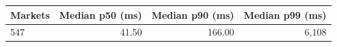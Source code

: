 \begin{tabular}{lrrr}
\toprule
Markets & Median p50 (ms) & Median p90 (ms) & Median p99 (ms) \\
\midrule
547 & 41.50 & 166.00 & 6,108 \\
\bottomrule
\end{tabular}
